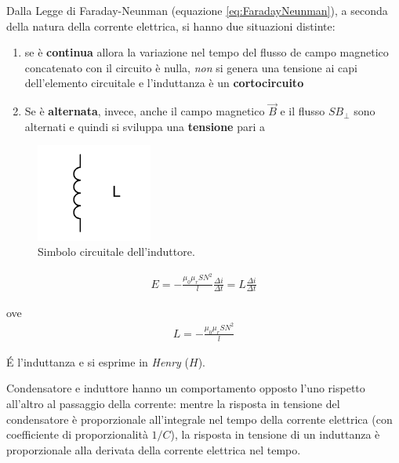 \documentclass[17pt]{extarticle}
\begin{document}
\begin{enumerate}
Dalla Legge di Faraday-Neunman (equazione \ref{eq:FaradayNeunman}), a seconda della natura della corrente elettrica, si hanno due situazioni distinte:


\begin{enumerate}
	\item se è {\bf continua} allora la variazione nel tempo del flusso de campo magnetico concatenato con il circuito è nulla, \emph{non} si genera una tensione ai capi dell'elemento circuitale e l'induttanza è un {\bf cortocircuito}%

	\item Se è {\bf alternata}, invece, anche il campo magnetico $\vec{B}$ e il flusso $SB_{\perp}$ sono alternati e quindi si sviluppa una {\bf tensione} pari a%
\end{enumerate}
\begin{figure}[b!]		
	\centering
   	\includegraphics[width=1.5in]{induttoreSimbolo.png}%
  	\caption{Simbolo circuitale dell'induttore.}
   	\label{fig:simboloInduttore}
\end{figure}%



\begin{eqnarray}
	E = -\frac{\mu_0\mu_r SN^2}{l}\frac{\Delta i}{\Delta t} = L\frac{\Delta i}{\Delta t}
\end{eqnarray}

ove
\begin{eqnarray}
	L = -\frac{\mu_0\mu_r SN^2}{l}
\end{eqnarray}

\'E l'induttanza e si esprime in \emph{Henry} ($H$).

Condensatore e induttore hanno un comportamento opposto l'uno rispetto all'altro al passaggio della corrente: mentre la risposta in tensione del condensatore è proporzionale all'integrale nel tempo della corrente elettrica (con coefficiente di proporzionalità $1/C$), la risposta in tensione di un induttanza è proporzionale alla derivata della corrente elettrica nel tempo.



\end{enumerate}
\end{document}

